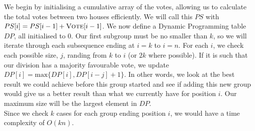 \documentclass{article}
\begin{document}
\begin{solution}
We begin by initialising a cumulative array of the votes, allowing us to calculate the total votes between two houses efficiently. We will call this $PS$ with $PS[i] = PS[i-1] + \mathsf{\textsc{Vote}}[i-1]$. We now define a Dynamic Programming table $DP$, all initialised to $0$. Our first subgroup must be no smaller than $k$, so we will iterate through each subsequence ending at $i = k$ to $i = n$. For each $i$, we check each possible size, $j$, randing from $k$ to $i$ (or $2k$ where possible). If it is such that our division has a majority favourable vote, we update $DP[i] = \text{max} \{DP[i], DP[i-j] + 1\}$. In other words, we look at the best result we could achieve before this group started and see if adding this new group would give us a better result than what we currently have for position $i$. Our maximum size will be the largest element in $DP$.\\

Since we check $k$ cases for each group ending position $i$, we would have a time complexity of $O(kn)$. 
\end{solution}
\end{document}
